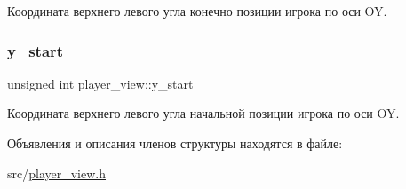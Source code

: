 Координата верхнего левого угла конечно позиции игрока по оси OY. 

\mbox{\label{structplayer__view_a35d236e445af2ed345f6b6147ea66aca}} 
\subsubsection{\texorpdfstring{y\+\_\+start}{y\_start}}
{\footnotesize\ttfamily unsigned int player\+\_\+view\+::y\+\_\+start}



Координата верхнего левого угла начальной позиции игрока по оси OY. 



Объявления и описания членов структуры находятся в файле\+:\begin{DoxyCompactItemize}
\item 
src/\hyperlink{player__view_8h}{player\+\_\+view.\+h}\end{DoxyCompactItemize}
